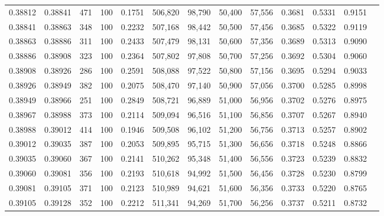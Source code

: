 \begin{tabular}{rrrrrrrrrrrrr}
0.38812 & 0.38841 &    471 & 100 &                                     0.1751 & 506,820 &  98,790 &  50,400 &  57,556 & 0.3681 & 0.5331 & 0.9151 \\
0.38841 & 0.38863 &    348 & 100 &                                     0.2232 & 507,168 &  98,442 &  50,500 &  57,456 & 0.3685 & 0.5322 & 0.9119 \\
0.38863 & 0.38886 &    311 & 100 &                                     0.2433 & 507,479 &  98,131 &  50,600 &  57,356 & 0.3689 & 0.5313 & 0.9090 \\
0.38886 & 0.38908 &    323 & 100 &                                     0.2364 & 507,802 &  97,808 &  50,700 &  57,256 & 0.3692 & 0.5304 & 0.9060 \\
0.38908 & 0.38926 &    286 & 100 &                                     0.2591 & 508,088 &  97,522 &  50,800 &  57,156 & 0.3695 & 0.5294 & 0.9033 \\
0.38926 & 0.38949 &    382 & 100 &                                     0.2075 & 508,470 &  97,140 &  50,900 &  57,056 & 0.3700 & 0.5285 & 0.8998 \\
0.38949 & 0.38966 &    251 & 100 &                                     0.2849 & 508,721 &  96,889 &  51,000 &  56,956 & 0.3702 & 0.5276 & 0.8975 \\
0.38967 & 0.38988 &    373 & 100 &                                     0.2114 & 509,094 &  96,516 &  51,100 &  56,856 & 0.3707 & 0.5267 & 0.8940 \\
0.38988 & 0.39012 &    414 & 100 &                                     0.1946 & 509,508 &  96,102 &  51,200 &  56,756 & 0.3713 & 0.5257 & 0.8902 \\
0.39012 & 0.39035 &    387 & 100 &                                     0.2053 & 509,895 &  95,715 &  51,300 &  56,656 & 0.3718 & 0.5248 & 0.8866 \\
0.39035 & 0.39060 &    367 & 100 &                                     0.2141 & 510,262 &  95,348 &  51,400 &  56,556 & 0.3723 & 0.5239 & 0.8832 \\
0.39060 & 0.39081 &    356 & 100 &                                     0.2193 & 510,618 &  94,992 &  51,500 &  56,456 & 0.3728 & 0.5230 & 0.8799 \\
0.39081 & 0.39105 &    371 & 100 &                                     0.2123 & 510,989 &  94,621 &  51,600 &  56,356 & 0.3733 & 0.5220 & 0.8765 \\
0.39105 & 0.39128 &    352 & 100 &                                     0.2212 & 511,341 &  94,269 &  51,700 &  56,256 & 0.3737 & 0.5211 & 0.8732 \\

\end{tabular}
